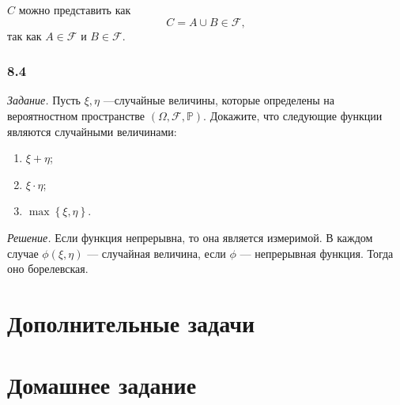 $C$ можно представить как
$$C =
A \cup B \in \mathcal{F},$$
так как $A \in \mathcal{F} $ и $B \in \mathcal{F} $.

\subsubsection*{8.4}

\textit{Задание.} Пусть $ \xi, \eta $ ---случайные величины, которые определены на вероятностном пространстве $ \left( \Omega, \mathcal{F}, \mathbb{P} \right) $.
Докажите, что следующие функции являются случайными величинами:
\begin{enumerate}[label=\alph*)]
\item $ \xi + \eta $;
\item $ \xi \cdot \eta $;
\item $ \max \left\{ \xi, \eta \right\} $. 
\end{enumerate}

\textit{Решение.} Если функция непрерывна, то она является измеримой.
В каждом случае $ \phi \left( \xi, \eta \right) $ --- случайная величина, если $ \phi $ --- непрерывная функция.
Тогда оно борелевская.

\section*{Дополнительные задачи}

\section*{Домашнее задание}
